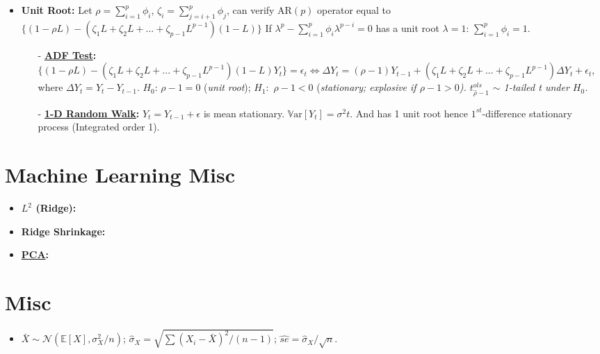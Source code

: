 \documentclass[9pt, landscape]{article}
\begin{document}
\begin{multicols*}{3}
\begin{itemize}
	\item \textbf{Unit Root:} Let $\rho = \sum_{i=1}^p \phi_i$, $\zeta_i = \sum_{j=i+1}^p \phi_j$, can verify AR$(p)$ operator equal to $\{(1-\rho L) - (\zeta_1 L + \zeta_2 L + ...  + \zeta_{p-1}L^{p-1})(1-L)\}$
	If $\lambda^p - \sum_{i=1}^p \phi_i \lambda^{p-i} = 0$ has a unit root $\lambda=1$: $\sum_{i=1}^p \phi_i = 1$.
	\begin{itemize}[leftmargin=10pt,noitemsep,topsep=0pt,partopsep=0pt]
		\item[-] \textbf{\href{https://en.wikipedia.org/wiki/Augmented_Dickey-Fuller_test}{ADF Test}:} $\{(1-\rho L) - (\zeta_1 L + \zeta_2 L + ...  + \zeta_{p-1}L^{p-1})(1-L)Y_t\} = \epsilon_t \iff \Delta Y_t = (\rho-1) Y_{t-1} + (\zeta_1 L + \zeta_2 L + ...  + \zeta_{p-1}L^{p-1})\Delta Y_t + \epsilon_t$, where $\Delta Y_t = Y_t - Y_{t-1}$. $H_0$: $\rho-1=0$ (\textit{unit root}); $H_1:$ $\rho-1<0$ (\textit{stationary; explosive if $\rho-1>0$). $t_{\widehat{\rho}-1}^{ols}$ $\sim$ 1-tailed t under $H_0$.}
		\item[-] \textbf{\href{https://en.wikipedia.org/wiki/Random_walk}{1-D Random Walk}:} $Y_t = Y_{t-1} + \epsilon$ is mean stationary. $\mathrm{\mathbb{V}ar}\left[Y_t\right] = \sigma^2 t$. And has 1 unit root hence $1^{st}$-difference stationary process (Integrated order 1).
	\end{itemize}
\end{itemize}


\section{Machine Learning Misc}
\begin{itemize}
	\item \textbf{$L^2$ (Ridge):}
	\item \textbf{Ridge Shrinkage:}
	\item \textbf{\href{https://en.wikipedia.org/wiki/Principal_component_analysis}{PCA}:}
\end{itemize}


\section{Misc}
\begin{itemize}
	\item $\bar{X}\sim \mathcal{N}(\mathbb{E}\left[X\right], \sigma^2_X/n)$; $\widehat{\sigma}_X = \sqrt{\sum(X_i - \bar{X})^2/(n-1)}$; $\widehat{se} = \widehat{\sigma}_X/\sqrt{n}$. 
\end{itemize}


\end{multicols*}
\end{document}
